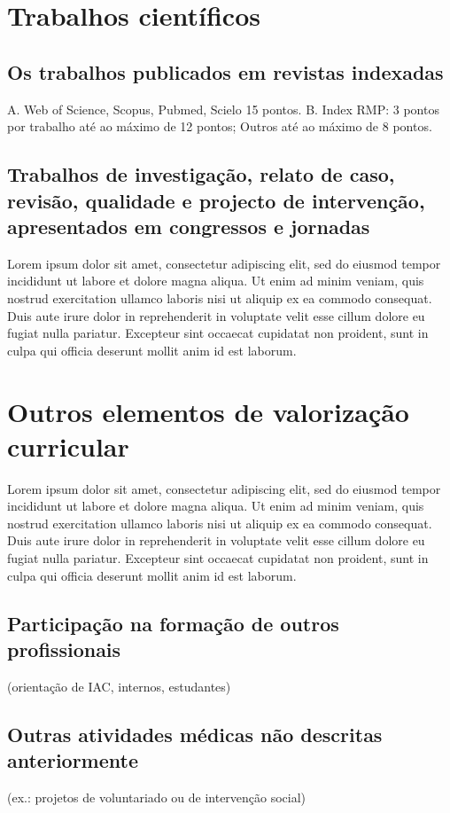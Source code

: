 \documentclass{report}
\begin{document}
\chapter{Trabalhos científicos}

\section{Os trabalhos publicados em revistas indexadas}
A. Web of Science, Scopus, Pubmed, Scielo 15 pontos.
B. Index RMP: 3
pontos por trabalho até ao máximo de 12 pontos; Outros até ao máximo de 8 pontos.

\section{Trabalhos de investigação, relato de caso, revisão, qualidade e projecto de intervenção, apresentados em congressos e jornadas}
Lorem ipsum dolor sit amet, consectetur adipiscing elit, sed do eiusmod tempor incididunt ut labore et dolore magna aliqua. Ut enim ad minim veniam, quis nostrud exercitation ullamco laboris nisi ut aliquip ex ea commodo consequat. Duis aute irure dolor in reprehenderit in voluptate velit esse cillum dolore eu fugiat nulla pariatur. Excepteur sint occaecat cupidatat non proident, sunt in culpa qui officia deserunt mollit anim id est laborum.

\chapter{Outros elementos de valorização curricular}
Lorem ipsum dolor sit amet, consectetur adipiscing elit, sed do eiusmod tempor incididunt ut labore et dolore magna aliqua. Ut enim ad minim veniam, quis nostrud exercitation ullamco laboris nisi ut aliquip ex ea commodo consequat. Duis aute irure dolor in reprehenderit in voluptate velit esse cillum dolore eu fugiat nulla pariatur. Excepteur sint occaecat cupidatat non proident, sunt in culpa qui officia deserunt mollit anim id est laborum.

\section{Participação na formação de outros profissionais}
(orientação de IAC, internos, estudantes)

\section{Outras atividades médicas não descritas anteriormente}
(ex.: projetos de voluntariado ou de intervenção social)
\end{document}
